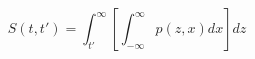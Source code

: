 \begin{equation}
S(t,t') = \int_{t'}^{\infty} \left[ \int_{-\infty}^\infty p(z,x) dx\right] dz
\end{equation}